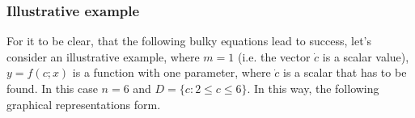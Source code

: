 \documentclass[a4paper]{article}
\numberwithin{equation}{subsection}
\begin{document}
\subsubsection{Illustrative example}
For it to be clear, that the following bulky equations lead to success, let's consider an illustrative example, where $m=1$ (i.e. the vector $\dot{c}$ is a scalar value), $y=f(c;x)$ is a function with one parameter, where $\dot{c}$ is a scalar that has to be found. In this case $n=6$ and $D=\{ c: 2 \leq c \leq 6 \}$. In this way, the following graphical representations form.
\begin{figure}[h!]%
    \centering
    \qquad
    \caption{ }%
    \label{fig:example}%
\end{figure}
\end{document}
